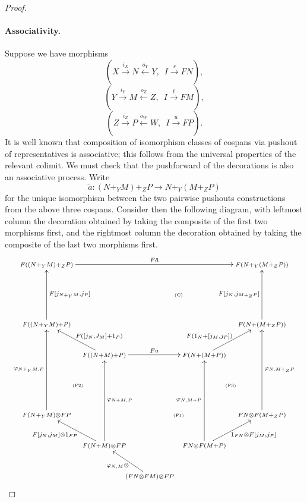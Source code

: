 \begin{proof}
\paragraph{Associativity.}
Suppose we have morphisms
\[
  (X \stackrel{i_X}\longrightarrow N \stackrel{o_Y}\longleftarrow Y,\enspace I
  \stackrel{s}\longrightarrow FN),
\]
\[
  (Y \stackrel{i_Y}\longrightarrow M \stackrel{o_Z}\longleftarrow Z,\enspace I
  \stackrel{t}\longrightarrow FM), 
\]
\[
  (Z \stackrel{i_Z}\longrightarrow P \stackrel{o_W}\longleftarrow W,\enspace I
  \stackrel{u}\longrightarrow FP).
\]
It is well known that composition of isomorphism classes of cospans via
pushout of representatives is associative; this follows from the universal
properties of the relevant colimit. We must check that the pushforward of the
decorations is also an associative process. Write 
\[
  \tilde a\colon  (N+_YM)+_ZP \longrightarrow N+_Y(M+_ZP)
\]
for the unique isomorphism between the two pairwise pushouts constructions
from the above three cospans. Consider then the following diagram, with leftmost
column the decoration obtained by taking the composite of the first two morphisms
first, and the rightmost column the decoration obtained by taking the composite
of the last two morphisms first.
\[
  \xymatrixcolsep{-.58pc}
  \xymatrix{ 
    \scriptstyle F((N+_YM)+_ZP) \ar[rrrrrrrr]^{F\tilde a} &&&&&&&&
    \scriptstyle F(N+_Y(M+_ZP)) \\
    &&&& \textrm{\tiny(C)} \\
    \scriptstyle F((N+_YM)+P) \ar[uu]_{F[j_{N+_YM},j_P]} &&&&&&&& \scriptstyle
    F(N+(M+_ZP)) \ar[uu]^{F[j_N,j_{M+_ZP}]} \\
    && \scriptstyle F((N+M)+P) \ar[ull]_(.35)*+<6pt>_{\scriptstyle F([j_N,J_M]+1_P)}
    \ar[rrrr]^{Fa} &&&& \scriptstyle F(N+(M+P))
    \ar[urr]^(.35)*+<6pt>^{\scriptstyle F(1_N+[j_M,j_P])} \\
    & \textrm{\tiny(F2)} &&&&&& \textrm{\tiny(F3)} \\
    \scriptstyle F(N+_YM)\otimes FP \ar[uuu]^{\varphi_{N+_YM,P}} &&&& 
    \textrm{\tiny(F1)} &&&& \scriptstyle FN\otimes F(M+_ZP)
    \ar[uuu]_{\varphi_{N,M+_ZP}} \\
    && \scriptstyle F(N+M)\otimes FP \ar[ull]^(.6)*+<6pt>^{\scriptstyle
      F[j_N,j_M] \otimes 1_{FP}} \ar[uuu]_{\varphi_{N+M,P}} &&&& \scriptstyle
      FN \otimes F(M+P) \ar[urr]_(.6)*+<6pt>_{\scriptstyle 1_{FN} \otimes
    F[j_M,j_P]} \ar[uuu]^{\varphi_{N,M+P}} \\
    &&& \scriptstyle (FN \otimes FM) \otimes FP \ar[ul]^{\varphi_{N,M} \otimes
}}\]
\end{proof}
